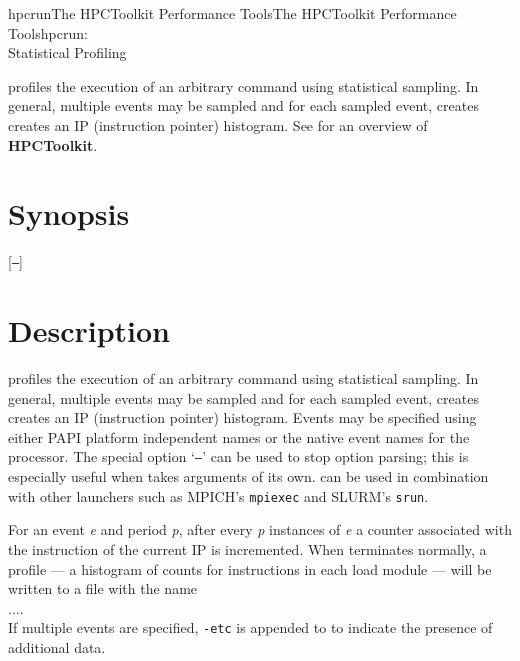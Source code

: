 \documentclass[english]{article}
\begin{document}
\begin{Name}{1}{hpcrun}{The HPCToolkit Performance Tools}{The HPCToolkit Performance Tools}{hpcrun:\\ Statistical Profiling}

 profiles the execution of an arbitrary command using statistical
sampling.
In general, multiple events may be sampled and for each sampled event,  creates creates an IP (instruction pointer) histogram.
See  for an overview of \textbf{HPCToolkit}.

\end{Name}

\section{Synopsis}

  [\texttt{--}]  

 

\section{Description}

 profiles the execution of an arbitrary command  using statistical sampling.
In general, multiple events may be sampled and for each sampled event,  creates creates an IP (instruction pointer) histogram.
Events may be specified using either PAPI platform independent names or the native event names for the processor.
The special option `\texttt{--}' can be used to stop  option parsing; this is especially useful when  takes arguments of its own.
 can be used in combination with other launchers such as MPICH's \texttt{mpiexec} and SLURM's \texttt{srun}.

For an event \emph{e} and period \emph{p}, after every \emph{p} instances of \emph{e} a counter associated with the instruction of the current IP is incremented.
When  terminates normally, a profile --- a histogram of counts for instructions in each load module --- will be written to a file with the name\\
\SP\SP\SP {}....\\
If multiple events are specified, \texttt{-etc} is appended to  to indicate the presence of additional data.
\end{document}
